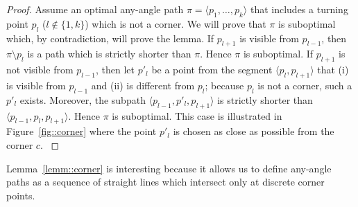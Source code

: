 \begin{proof}
{
  Assume an optimal any-angle path $\pi = \langle p_1,\dots,p_k \rangle$ 
  that includes a turning point $p_l$ ($l \not\in \{1,k\}$) 
  which is not a corner.  
  We will prove that $\pi$ is suboptimal 
  which, by contradiction, will prove the lemma.  
  If $p_{l+1}$ is visible from $p_{l-1}$, 
  then  $\pi \setminus p_l$ is a path 
  which is strictly shorter than $\pi$.  
  Hence $\pi$ is suboptimal.  
  If $p_{l+1}$ is not visible from $p_{l-1}$, 
  then let $p'_{l}$ be a point from the segment $\langle p_l,p_{l+1} \rangle$ 
  that (i) is visible from $p_{l-1}$ 
  and (ii) is different from $p_l$; 
  because $p_l$ is not a corner, 
  such a $p'_l$ exists.  
  Moreover, the subpath $\langle p_{l-1}, p'_{l}, p_{l+1} \rangle$ is 
  strictly shorter than $\langle p_{l-1}, p_{l}, p_{l+1}\rangle$. 
  Hence $\pi$ is suboptimal.
  This case is illustrated in Figure~\ref{fig::corner}  
  where the point $p'_l$ is chosen as close as possible from the corner $c$.  
}
\end{proof}
Lemma~\ref{lemm::corner} is interesting because it allows us to define 
any-angle paths as a sequence of straight lines which intersect only at
discrete corner points.
